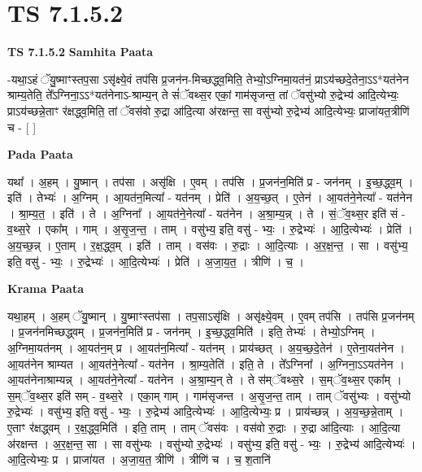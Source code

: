 \documentclass[17pt]{extarticle}
\begin{document}
\section{ TS 7.1.5.2 }

\textbf{TS 7.1.5.2 } \newline
\textbf{Samhita Paata} \newline

-यथा॒ऽहं ॅयु॒ष्माꣳस्तप॒सा ऽसृ॑क्ष्ये॒वं तप॑सि प्र॒जन॑न-मिच्छद्ध्व॒मिति॒ तेभ्यो॒ऽग्निमा॒यत॑नं॒ प्राऽय॑च्छदे॒तेना॒ऽऽ*यत॑नेन श्राम्य॒तेति॒ ते᳚ऽग्निना॒ऽऽ*यत॑नेनाऽ-श्राम्य॒न् ते सं॑ॅवथ्स॒र एकां॒ गाम॑सृजन्त॒ तां ॅवसु॑भ्यो रु॒द्रेभ्य॑ आदि॒त्येभ्यः॒ प्राऽय॑च्छन्ने॒ताꣳ र॑क्षद्ध्व॒मिति॒ तां ॅवस॑वो रु॒द्रा आ॑दि॒त्या अ॑रक्षन्त॒ सा वसु॑भ्यो रु॒द्रेभ्य॑ आदि॒त्येभ्यः॒ प्राजा॑यत॒त्रीणि॑ च - [  ] \newline

\textbf{Pada Paata} \newline

यथा᳚ । अ॒हम् । यु॒ष्मान् । तप॑सा । असृ॑क्षि । ए॒वम् । तप॑सि । प्र॒जन॑न॒मिति॑ प्र - जन॑नम् । इ॒च्छ॒द्ध्व॒म् । इति॑ । तेभ्यः॑ । अ॒ग्निम् । आ॒यत॑न॒मित्या᳚ - यत॑नम् । प्रेति॑ । अ॒य॒च्छ॒त् । ए॒तेन॑ । आ॒यत॑ने॒नेत्या᳚ - यत॑नेन । श्रा॒म्य॒त॒ । इति॑ । ते । अ॒ग्निना᳚ । आ॒यत॑ने॒नेत्या᳚ - यत॑नेन । अ॒श्रा॒म्य॒न्न् । ते । सं॒ॅव॒थ्स॒र इति॑ सं - व॒थ्स॒रे । एका᳚म् । गाम् । अ॒सृ॒ज॒न्त॒ । ताम् । वसु॑भ्य॒ इति॒ वसु॑ - भ्यः॒ । रु॒द्रेभ्यः॑ । आ॒दि॒त्येभ्यः॑ । प्रेति॑ । अ॒य॒च्छ॒न्न् । ए॒ताम् । र॒क्ष॒द्ध्व॒म् । इति॑ । ताम् । वस॑वः । रु॒द्राः । आ॒दि॒त्याः । अ॒र॒क्ष॒न्त॒ । सा । वसु॑भ्य॒ इति॒ वसु॑ - भ्यः॒ । रु॒द्रेभ्यः॑ । आ॒दि॒त्येभ्यः॑ । प्रेति॑ । अ॒जा॒य॒त॒ । त्रीणि॑ । च॒ ।  \newline


\textbf{Krama Paata} \newline

यथा॒हम् । अ॒हम् ॅयु॒ष्मान् । यु॒ष्माꣳस्तप॑सा । तप॒साऽसृ॑क्षि । असृ॑क्ष्ये॒वम् । ए॒वम् तप॑सि । तप॑सि प्र॒जन॑नम् । प्र॒जन॑नमिच्छद्ध्वम् । प्र॒जन॑न॒मिति॑ प्र - जन॑नम् । इ॒च्छ॒द्ध्व॒मिति॑ । इति॒ तेभ्यः॑ । तेभ्यो॒ऽग्निम् । अ॒ग्निमा॒यत॑नम् । आ॒यत॑न॒म् प्र । आ॒यत॑न॒मित्या᳚ - यत॑नम् । प्राय॑च्छत् । अ॒य॒च्छ॒दे॒तेन॑ । ए॒तेना॒यत॑नेन । आ॒यत॑नेन श्राम्यत । आ॒यत॑ने॒नेत्या᳚ - यत॑नेन । श्रा॒म्य॒तेति॑ । इति॒ ते । ते᳚ऽग्निना᳚ । अ॒ग्निना॒ऽऽयत॑नेन । आ॒यत॑नेनाश्राम्यन्न् । आ॒यत॑ने॒नेत्या᳚ - यत॑नेन । अ॒श्रा॒म्य॒न् ते । ते स॑म्ॅवथ्स॒रे । स॒म्ॅव॒थ्स॒र एका᳚म् । स॒म्ॅव॒थ्स॒र इति॑ सम् - व॒थ्स॒रे । एका॒म् गाम् । गाम॑सृजन्त । अ॒सृ॒ज॒न्त॒ ताम् । ताम् ॅवसु॑भ्यः । वसु॑भ्यो रु॒द्रेभ्यः॑ । वसु॑भ्य॒ इति॒ वसु॑ - भ्यः॒ । रु॒द्रेभ्य॑ आदि॒त्येभ्यः॑ । आ॒दि॒त्येभ्यः॒ प्र । प्राय॑च्छन्न् । अ॒य॒च्छ॒न्ने॒ताम् । ए॒ताꣳ र॑क्षद्ध्वम् । र॒क्ष॒द्ध्व॒मिति॑ । इति॒ ताम् । ताम् ॅवस॑वः । वस॑वो रु॒द्राः । रु॒द्रा आ॑दि॒त्याः । आ॒दि॒त्या अ॑रक्षन्त । अ॒र॒क्ष॒न्त॒ सा । सा वसु॑भ्यः । वसु॑भ्यो रु॒द्रेभ्यः॑ । वसु॑भ्य॒ इति॒ वसु॑ - भ्यः॒ । रु॒द्रेभ्य॑ आदि॒त्येभ्यः॑ । आ॒दि॒त्येभ्यः॒ प्र । प्राजा॑यत । अ॒जा॒य॒त॒ त्रीणि॑ । त्रीणि॑ च । च॒ श॒तानि॑ \newline
\end{document}
